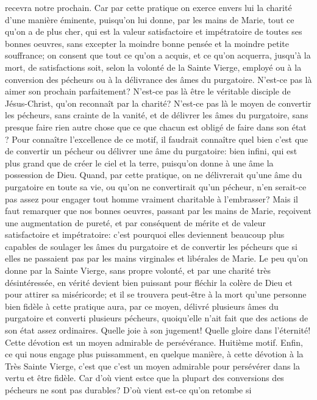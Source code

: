 recevra notre prochain. Car par cette pratique on exerce envers lui la charité d'une manière éminente, puisqu'on lui
donne, par les mains de Marie, tout ce qu'on a de plus cher, qui est la valeur satisfactoire et impétratoire de toutes
ses bonnes oeuvres, sans excepter la moindre bonne pensée et la moindre petite souffrance; on consent que tout
ce qu'on a acquis, et ce qu'on acquerra, jusqu'à la mort, de satisfactions soit, selon la volonté de la Sainte Vierge,
employé ou à la conversion des pécheurs ou à la délivrance des âmes du purgatoire.
N'est-ce pas là aimer son prochain parfaitement? N'est-ce pas là être le véritable disciple de Jésus-Christ, qu'on
reconnaît par la charité? N'est-ce pas là le moyen de convertir les pécheurs, sans crainte de la vanité, et de
délivrer les âmes du purgatoire, sans presque faire rien autre chose que ce que chacun est obligé de faire dans
son état ?
 Pour connaître l'excellence de ce motif, il faudrait connaître quel bien c'est que de convertir un pécheur ou
délivrer une âme du purgatoire: bien infini, qui est plus grand que de créer le ciel et la terre, puisqu'on donne à une
âme la possession de Dieu. Quand, par cette pratique, on ne délivrerait qu'une âme du purgatoire en toute sa vie,
ou qu'on ne convertirait qu'un pécheur, n'en serait-ce pas assez pour engager tout homme vraiment charitable à
l'embrasser? Mais il faut remarquer que nos bonnes oeuvres, passant par les mains de Marie, reçoivent une
augmentation de pureté, et par conséquent de mérite et de valeur satisfactoire et impétratoire: c'est pourquoi elles
deviennent beaucoup plus capables de soulager les âmes du purgatoire et de convertir les pécheurs que si elles
ne passaient pas par les mains virginales et libérales de Marie. Le peu qu'on donne par la Sainte Vierge, sans
propre volonté, et par une charité très désintéressée, en vérité devient bien puissant pour fléchir la colère de Dieu
et pour attirer sa miséricorde; et il se trouvera peut-être à la mort qu'une personne bien fidèle à cette pratique aura,
par ce moyen, délivré plusieurs âmes du purgatoire et converti plusieurs pécheurs, quoiqu'elle n'ait fait que des
actions de son état assez ordinaires. Quelle joie à son jugement! Quelle gloire dans l'éternité!
Cette dévotion est un moyen admirable de persévérance.
 Huitième motif. Enfin, ce qui nous engage plus puissamment, en quelque manière, à cette dévotion à la Très
Sainte Vierge, c'est que c'est un moyen admirable pour persévérer dans la vertu et être fidèle. Car d'où vient estce que la plupart des conversions des pécheurs ne sont pas durables? D'où vient est-ce qu'on retombe si
